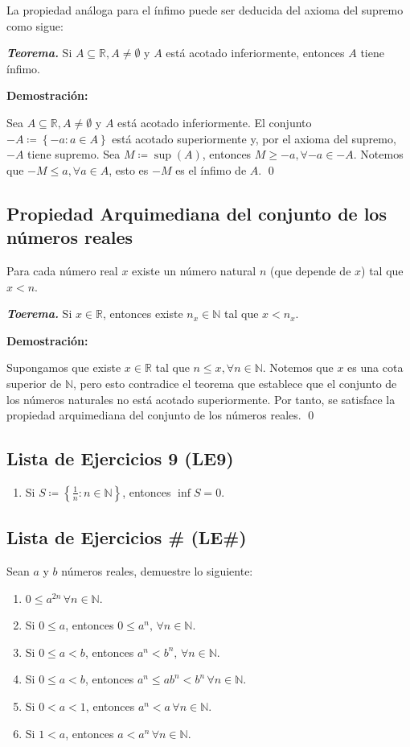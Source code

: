 \documentclass[11pt]{article}
\newcommand{\N}{\mathbb{N}}
\newcommand{\R}{\mathbb{R}}
\def\defined #1{\coloneqq \left\{#1\right\}}
\begin{document}
La propiedad análoga para el ínfimo puede ser deducida del axioma del supremo como sigue:

\textbf{\textit{Teorema.}} Si $A\subseteq \R, A\neq \emptyset$ y $A$ está acotado inferiormente, entonces $A$ tiene ínfimo.

\textbf{Demostración:}

Sea $A\subseteq \R, A\neq \emptyset$ y $A$ está acotado inferiormente. El conjunto $-A \defined{-a: a\in A}$ está acotado superiormente y, por el axioma del supremo, $-A$ tiene supremo. Sea $M\coloneqq \sup{(A)}$, entonces $M\geq -a, \forall -a\in -A$. Notemos que $-M\leq a, \forall a\in A$, esto es $-M$ es el ínfimo de $A$. \qed

\subsection*{Propiedad Arquimediana del conjunto de los números reales}

Para cada número real $x$ existe un número natural $n$ (que depende de $x$) tal que $x<n$.

\textbf{\textit{Toerema.}} Si $x\in \R$, entonces existe $n_x\in \N$ tal que $x<n_x$.

\textbf{Demostración:}

Supongamos que existe $x\in \R$ tal que $n\leq x, \forall n\in \N$. Notemos que $x$ es una cota superior de $\N$, pero esto contradice el teorema que establece que el conjunto de los números naturales no está acotado superiormente. Por tanto, se satisface la propiedad arquimediana del conjunto de los números reales. \qed

\subsection*{Lista de Ejercicios 9 (LE9)}

\begin{enumerate}[label=\alph*)]
    \item Si $S \defined{\frac{1}{n}: n\in \N}$, entonces $\inf{S=0}$.
\end{enumerate}

\subsection*{Lista de Ejercicios \# (LE\#)}

Sean $a$ y $b$ números reales, demuestre lo siguiente:

\begin{enumerate}[label=\alph*),font=\bfseries]
    \item $0 \leq a^{2n} \, \forall n\in \N$.
    \item Si $0\leq a$, entonces $ 0 \leq a^n, \, \forall n\in \N$.
    \item Si $0 \leq a <b$, entonces $a^n < b^n, \, \forall n\in \N$.
    \item Si $0 \leq a <b$, entonces $a^n \leq ab^n < b^n \, \forall n\in \N$.
    \item Si $0<a<1$, entonces $a^n<a \, \forall n\in \N$.
    \item Si $1<a$, entonces $a<a^n \, \forall n\in \N$.
\end{enumerate}
\end{document}
